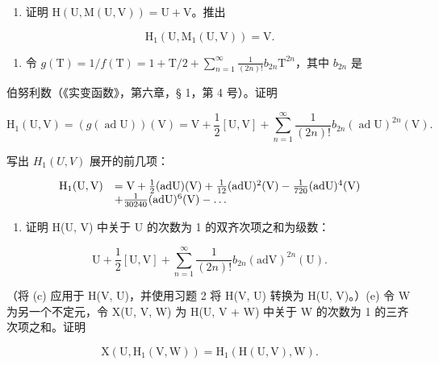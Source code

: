 \begin{enumerate}
\def\labelenumi{(\alph{enumi})}
\setcounter{enumi}{1}
\tightlist
\item
  证明 \(\mathrm{H}(\mathrm{U},\mathrm{M}(\mathrm{U},\mathrm{V})) = \mathrm{U} + \mathrm{V}\)。推出
\end{enumerate}

\[
\mathrm{H} _ {1} (\mathrm{U}, \mathrm{M} _ {1} (\mathrm{U}, \mathrm{V})) = \mathrm{V}.
\]

\begin{enumerate}
\def\labelenumi{(\alph{enumi})}
\setcounter{enumi}{2}
\tightlist
\item
  令 \(g(\mathrm{T}) = 1 / f(\mathrm{T}) = 1 + \mathrm{T} / 2 + \sum_{n=1}^{\infty} \frac{1}{(2n)!} b_{2n}\mathrm{T}^{2n}\)，其中 \(b_{2n}\) 是
\end{enumerate}

伯努利数（《实变函数》，第六章，§ 1，第 4 号）。证明

\[
\mathrm{H} _ {1} (\mathrm{U}, \mathrm{V}) = (g (\operatorname{ad} \mathrm{U})) (\mathrm{V}) = \mathrm{V} + \frac {1}{2} [ \mathrm{U}, \mathrm{V} ] + \sum_ {n = 1} ^ {\infty} \frac {1}{(2 n) !} b _ {2 n} (\operatorname{ad} \mathrm{U}) ^ {2 n} (\mathrm{V}).
\]

写出 \(H_{1}(U, V)\) 展开的前几项：

\[
\begin{array}{r l} \mathrm{H} _ {1} (\mathrm{U}, \mathrm{V}) & = \mathrm{V} + \frac {1}{2} (\mathrm{adU}) (\mathrm{V}) + \frac {1}{12} (\mathrm{adU}) ^ {2} (\mathrm{V}) - \frac {1}{720} (\mathrm{adU}) ^ {4} (\mathrm{V}) \\ & + \frac {1}{30240} (\mathrm{adU}) ^ {6} (\mathrm{V}) - \dots \end{array}
\]

\begin{enumerate}
\def\labelenumi{(\alph{enumi})}
\setcounter{enumi}{3}
\tightlist
\item
  证明 H(U, V) 中关于 U 的次数为 1 的双齐次项之和为级数：
\end{enumerate}

\[
\mathrm{U} + \frac {1}{2} [ \mathrm{U}, \mathrm{V} ] + \sum_ {n = 1} ^ {\infty} \frac {1}{(2 n) !} b _ {2 n} (\mathrm{adV}) ^ {2 n} (\mathrm{U}).
\]

（将 (c) 应用于 H(V, U)，并使用习题 2 将 H(V, U) 转换为 H(U, V)。）(e) 令 W 为另一个不定元，令 X(U, V, W) 为 H(U, V + W) 中关于 W 的次数为 1 的三齐次项之和。证明

\[
\mathrm{X} (\mathrm{U}, \mathrm{H} _ {1} (\mathrm{V}, \mathrm{W})) = \mathrm{H} _ {1} (\mathrm{H} (\mathrm{U}, \mathrm{V}), \mathrm{W}).
\]

